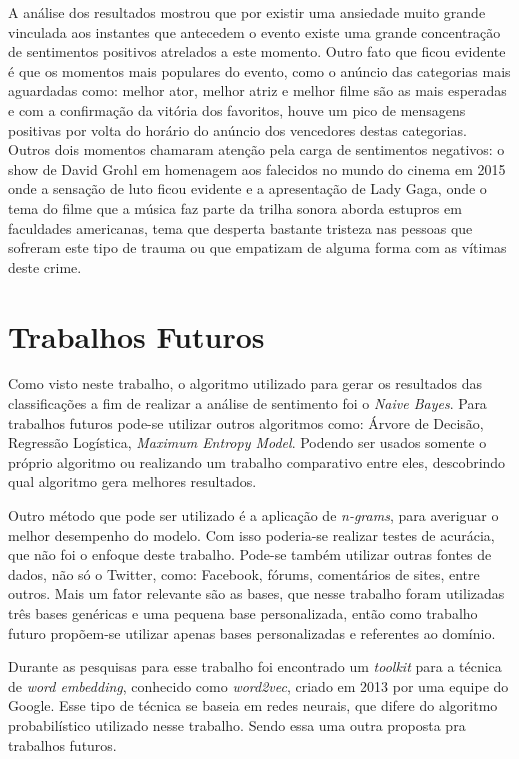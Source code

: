 A análise dos resultados mostrou que por existir uma ansiedade muito grande vinculada aos instantes que antecedem o evento existe uma grande concentração de sentimentos positivos atrelados a este momento. Outro fato que ficou evidente é que os momentos mais populares do evento, como o anúncio das categorias mais aguardadas como: melhor ator, melhor atriz e melhor filme são as mais esperadas e com a confirmação da vitória dos favoritos, houve um pico de mensagens positivas por volta do horário do anúncio dos vencedores destas categorias. Outros dois momentos chamaram atenção pela carga de sentimentos negativos: o show de David Grohl em homenagem aos falecidos no mundo do cinema em 2015 onde a sensação de luto ficou evidente e a apresentação de Lady Gaga, onde o tema do filme que a música  faz parte da trilha sonora aborda estupros em faculdades americanas, tema que desperta bastante tristeza nas pessoas que sofreram este tipo de trauma ou que empatizam de alguma forma com as vítimas deste crime.


\section{Trabalhos Futuros}\label{sec:8_trabfut}

Como visto neste trabalho, o algoritmo utilizado para gerar os resultados das classificações a fim de realizar a análise de sentimento foi o \textit{Naive Bayes}. Para trabalhos futuros pode-se utilizar outros algoritmos como: Árvore de Decisão, Regressão Logística, \textit{Maximum Entropy Model}. Podendo ser usados somente o próprio algoritmo ou realizando um trabalho comparativo entre eles, descobrindo qual algoritmo gera melhores resultados.

Outro método que pode ser utilizado é a aplicação de \textit{n-grams}, para averiguar o melhor desempenho do modelo. Com isso poderia-se realizar testes de acurácia, que não foi o enfoque deste trabalho. Pode-se também utilizar outras fontes de dados, não só o Twitter, como: Facebook, fórums, comentários de sites, entre outros. Mais um fator relevante são as bases, que nesse trabalho foram utilizadas três bases genéricas e uma pequena base personalizada, então como trabalho futuro propõem-se utilizar apenas bases personalizadas e referentes ao domínio.

Durante as pesquisas para esse trabalho foi encontrado um \textit{toolkit}  para a técnica de \textit{word embedding}, conhecido como \textit{word2vec}, criado em 2013 por uma equipe do Google. Esse tipo de técnica se baseia em redes neurais, que difere do algoritmo probabilístico utilizado nesse trabalho. Sendo essa uma outra proposta pra trabalhos futuros.

